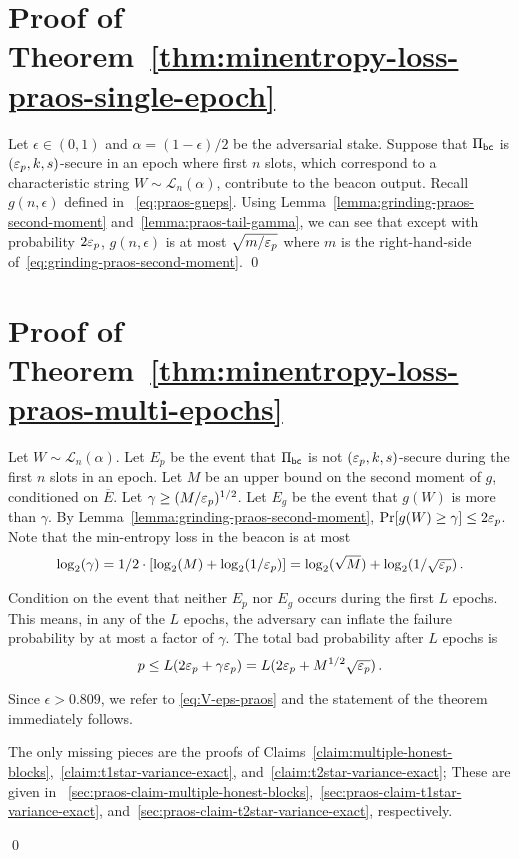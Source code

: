\section{Proof of Theorem~\ref{thm:minentropy-loss-praos-single-epoch}}
Let $\epsilon \in (0,1)$ and $\alpha = (1-\epsilon)/2$ be the adversarial stake.
Suppose that $\Pi_\mathsf{bc}$ is $(\mathsf{\varepsilon}_p, k, s)$-secure in an epoch 
where first $n$ slots, 
which correspond to a characteristic string $W \sim \mathcal{L}_n(\alpha)$, 
contribute to the beacon output.
Recall $g(n,\epsilon)$ defined in ~\eqref{eq:praos-gneps}.
Using Lemma~\ref{lemma:grinding-praos-second-moment} and~\ref{lemma:praos-tail-gamma}, 
we can see that except with probability $2\mathsf{\varepsilon}_p$, $g(n,\epsilon)$ is at most $\sqrt{m/\mathsf{\varepsilon}_p}$ 
where $m$ is the right-hand-side of~\eqref{eq:grinding-praos-second-moment}.
\hfill\qed









\section{Proof of Theorem~\ref{thm:minentropy-loss-praos-multi-epochs}}\label{sec:thm-praos-multiepoch}\label{sec:proof-praos-theorem}

Let $W \sim \mathcal{L}_n(\alpha)$. 
Let $E_p$ be the event that 
$\Pi_\mathsf{bc}$ is not $(\mathsf{\varepsilon}_p, k, s)$-secure during 
the first $n$ slots in an epoch. 
Let $M$ be an upper bound on the second moment of $g$, 
conditioned on $\overline{E}$. 
Let $\gamma \geq (M/\mathsf{\varepsilon}_p)^{1/2}$. 
Let $E_g$ be the event that $g(W)$ is more than $\gamma$.
By Lemma~\ref{lemma:grinding-praos-second-moment}, 
$\Pr[g(W) \geq \gamma] \leq 2 \mathsf{\varepsilon}_p$. 
Note that the min-entropy loss in the beacon is at most 
\begin{equation}\label{eq:log-gamma}
 \log_2(\gamma) 
 = 1/2 \cdot [\log_2(M) + \log_2(1/\mathsf{\varepsilon}_p)]
 = \log_2(\sqrt{M}) + \log_2(1/\sqrt{\mathsf{\varepsilon}_p})
 \,. 
\end{equation}


Condition on the event that neither $E_p$ nor $E_g$ 
occurs during the first $L$ epochs. 
This means, in any of the $L$ epochs, 
the adversary can inflate the failure probability 
by at most a factor of $\gamma$.
The total bad probability after $L$ epochs is
$$
  p
  \leq L (2 \mathsf{\varepsilon}_p + \gamma \mathsf{\varepsilon}_p)
  = L (2 \mathsf{\varepsilon}_p + M^{1/2} \sqrt{\mathsf{\varepsilon}_p})
  \,.
$$

Since $\epsilon > 0.809$, we refer to \eqref{eq:V-eps-praos} 
and the statement of the theorem immediately follows.

The only missing pieces are 
the proofs of Claims~\ref{claim:multiple-honest-blocks},~\ref{claim:t1star-variance-exact}, 
and~\ref{claim:t2star-variance-exact}; 
These are given in \Section~\ref{sec:praos-claim-multiple-honest-blocks},~\ref{sec:praos-claim-t1star-variance-exact}, and~\ref{sec:praos-claim-t2star-variance-exact}, respectively. 

\hfill\qed




